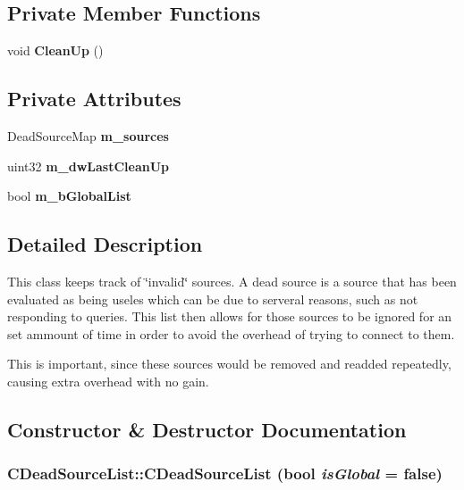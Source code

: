 \subsection*{Private Member Functions}
\begin{DoxyCompactItemize}
\item 
void {\bf CleanUp} ()\label{classCDeadSourceList_a347e95e31a1d7afb038bd42225eac601}

\end{DoxyCompactItemize}
\subsection*{Private Attributes}
\begin{DoxyCompactItemize}
\item 
DeadSourceMap {\bf m\_\-sources}\label{classCDeadSourceList_a05ff4f51c84b5831c053df147f812f27}

\item 
uint32 {\bf m\_\-dwLastCleanUp}\label{classCDeadSourceList_a78952528882b6dbd7e833ec5a704b5ce}

\item 
bool {\bf m\_\-bGlobalList}\label{classCDeadSourceList_a1c7e70b685a67a02ad343656ae9fe191}

\end{DoxyCompactItemize}


\subsection{Detailed Description}
This class keeps track of \char`\"{}invalid\char`\"{} sources. A dead source is a source that has been evaluated as being useles which can be due to serveral reasons, such as not responding to queries. This list then allows for those sources to be ignored for an set ammount of time in order to avoid the overhead of trying to connect to them.

This is important, since these sources would be removed and readded repeatedly, causing extra overhead with no gain. 

\subsection{Constructor \& Destructor Documentation}
\subsubsection[{CDeadSourceList}]{\setlength{\rightskip}{0pt plus 5cm}CDeadSourceList::CDeadSourceList (bool {\em isGlobal} = {\ttfamily false})}\label{classCDeadSourceList_a9137d692ca9cab8b10f181c9d0baed68}


